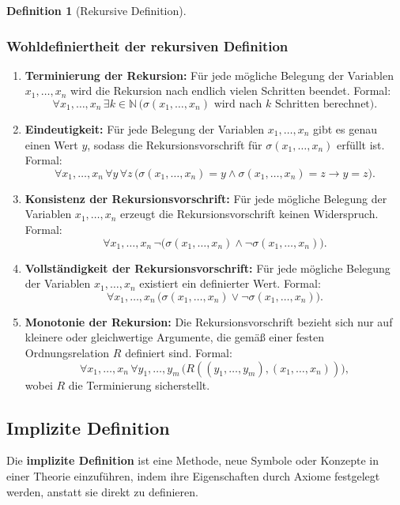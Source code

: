 \documentclass{book}
\theoremstyle{plain}
\theoremstyle{remark}
\theoremstyle{definition}
\newtheorem{definition}{Definition}[section]
\begin{document}
\begin{definition}[Rekursive Definition]
\subsubsection{Wohldefiniertheit der rekursiven Definition}
\begin{enumerate}
    \item \textbf{Terminierung der Rekursion:} Für jede mögliche Belegung der Variablen \(x_1, \ldots, x_n\) wird die Rekursion nach endlich vielen Schritten beendet. Formal:
    \[
    \forall x_1, \ldots, x_n \, \exists k \in \mathbb{N} \, \bigl( \text{\(\sigma(x_1, \ldots, x_n)\) wird nach \(k\) Schritten berechnet} \bigr).
    \]
    \item \textbf{Eindeutigkeit:} Für jede Belegung der Variablen \(x_1, \ldots, x_n\) gibt es genau einen Wert \(y\), sodass die Rekursionsvorschrift für \(\sigma(x_1, \ldots, x_n)\) erfüllt ist. Formal:
    \[
    \forall x_1, \ldots, x_n \, \forall y \, \forall z \, \bigl( \sigma(x_1, \ldots, x_n) = y \land \sigma(x_1, \ldots, x_n) = z \rightarrow y = z \bigr).
    \]
    \item \textbf{Konsistenz der Rekursionsvorschrift:} Für jede mögliche Belegung der Variablen \(x_1, \ldots, x_n\) erzeugt die Rekursionsvorschrift keinen Widerspruch. Formal:
    \[
    \forall x_1, \ldots, x_n \, \neg \bigl( \sigma(x_1, \ldots, x_n) \land \neg \sigma(x_1, \ldots, x_n) \bigr).
    \]
    \item \textbf{Vollständigkeit der Rekursionsvorschrift:} Für jede mögliche Belegung der Variablen \(x_1, \ldots, x_n\) existiert ein definierter Wert. Formal:
    \[
    \forall x_1, \ldots, x_n \, \bigl( \sigma(x_1, \ldots, x_n) \lor \neg \sigma(x_1, \ldots, x_n) \bigr).
    \]
    \item \textbf{Monotonie der Rekursion:} Die Rekursionsvorschrift bezieht sich nur auf kleinere oder gleichwertige Argumente, die gemäß einer festen Ordnungsrelation \(R\) definiert sind. Formal:
    \[
    \forall x_1, \ldots, x_n \, \forall y_1, \ldots, y_m \, \bigl( R((y_1, \ldots, y_m), (x_1, \ldots, x_n)) \bigr),
    \]
    wobei \(R\) die Terminierung sicherstellt.
\end{enumerate}
\end{definition}


\subsection{Implizite Definition}

Die \textbf{implizite Definition} ist eine Methode, neue Symbole oder Konzepte in einer Theorie einzuführen, indem ihre Eigenschaften durch Axiome festgelegt werden, anstatt sie direkt zu definieren.
\end{document}
